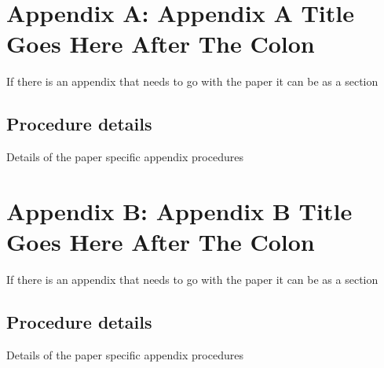 \printbibliography[heading=subbibnumbered]

% 
%     

\section{Appendix A: Appendix A Title Goes Here After The Colon}
If there is an appendix that needs to go with the paper it can be as a section \cite{kleeHellyTheoremIts1963}

\subsection{Procedure details}
Details of the paper specific appendix procedures


\section{Appendix B: Appendix B Title Goes Here After The Colon}
If there is an appendix that needs to go with the paper it can be as a section \cite{chenGraphHomotopyGraham2001}

\subsection{Procedure details}
Details of the paper specific appendix procedures